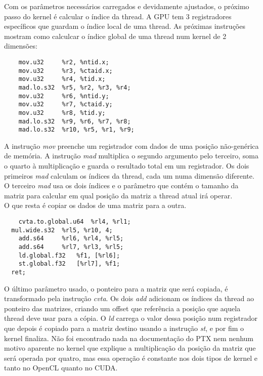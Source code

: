 Com os parâmetros necessários carregados e devidamente ajustados, o próximo passo do kernel é calcular o índice da thread. A GPU tem 3 registradores
específicos que guardam o índice local de uma thread. As próximas instruções mostram como calculcar o índice global de uma thread num kernel de 
2 dimensões:

\begin{lstlisting}
    mov.u32 	%r2, %ntid.x;
    mov.u32 	%r3, %ctaid.x;
    mov.u32 	%r4, %tid.x;
    mad.lo.s32 	%r5, %r2, %r3, %r4;
    mov.u32 	%r6, %ntid.y;
    mov.u32 	%r7, %ctaid.y;
    mov.u32 	%r8, %tid.y;
    mad.lo.s32 	%r9, %r6, %r7, %r8;
    mad.lo.s32 	%r10, %r5, %r1, %r9;
\end{lstlisting}

A instrução \textit{mov} preenche um registrador com dados de uma posição não-genérica de memória. A instrução \textit{mad} multiplica o segundo argumento
pelo terceiro, soma o quarto à multiplicação e guarda o resultado total em um registrador. Os dois primeiros \textit{mad} calculam os índices da thread,
cada um numa dimensão diferente. O terceiro \textit{mad} usa os dois índices e o parâmetro que contém o tamanho da matriz para calcular em qual posição da 
matriz a thread atual irá operar. \\

O que resta é copiar os dados de uma matriz para a outra.

\begin{lstlisting}
	cvta.to.global.u64 	%rl4, %rl1;
  mul.wide.s32 	%rl5, %r10, 4;
	add.s64 	%rl6, %rl4, %rl5;
	add.s64 	%rl7, %rl3, %rl5;
	ld.global.f32 	%f1, [%rl6];
	st.global.f32 	[%rl7], %f1;
  ret;
\end{lstlisting}

O último parâmetro usado, o ponteiro para a matriz que será copiada, é transformado pela instrução \textit{cvta}. Os dois \textit{add} adicionam os índices
da thread ao ponteiro das matrizes, criando um offset que referência a posição que aquela thread deve usar para a cópia. O \textit{ld} carrega o valor dessa
posição num registrador que depois é copiado para a matriz destino usando a instrução \textit{st}, e por fim o kernel finaliza. Não foi encontrado nada
na documentação do PTX nem nenhum motivo aparente no kernel que explique a multiplicação da posição da matriz que será operada por quatro, mas essa operação
é constante nos dois tipos de kernel e tanto no OpenCL quanto no CUDA.
